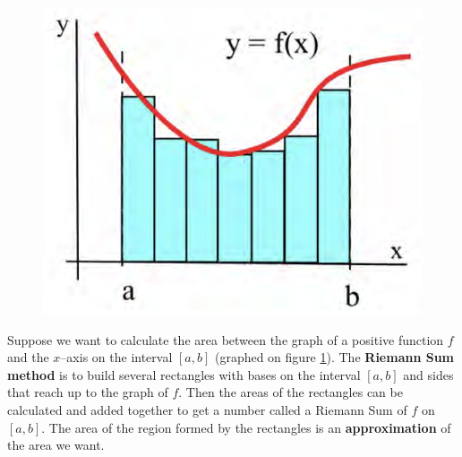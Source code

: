 \begin{figure}

\includegraphics[scale=0.4]{images/defIntgArea/RiemannSum.png}
\caption{ }
\label{fig:RiemannSum}
\end{figure}
\noindent Suppose we want to calculate the area between the graph of a positive function $f$ and the $x$–axis on the interval $[a, b]$ (graphed on figure \ref{fig:RiemannSum}). The \textbf{Riemann Sum method} is to build several rectangles with bases on the interval $[a, b]$ and sides that reach up to the graph of $f$. Then the areas of the rectangles can be calculated and added together to get a number called a Riemann Sum of $f$ on $[a, b]$. The area of the region formed by the rectangles is an \textbf{approximation} of the area we want.\\

